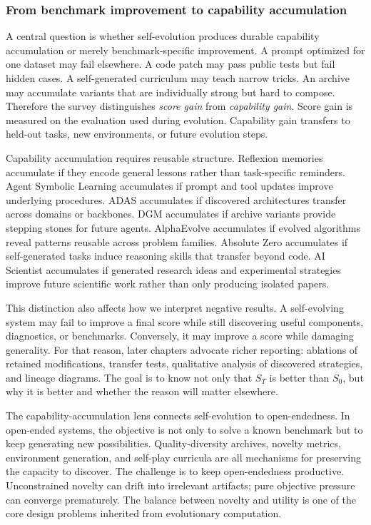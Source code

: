 \subsubsection{From benchmark improvement to capability accumulation}

A central question is whether self-evolution produces durable capability accumulation or merely benchmark-specific improvement. A prompt optimized for one dataset may fail elsewhere. A code patch may pass public tests but fail hidden cases. A self-generated curriculum may teach narrow tricks. An archive may accumulate variants that are individually strong but hard to compose. Therefore the survey distinguishes \emph{score gain} from \emph{capability gain}. Score gain is measured on the evaluation used during evolution. Capability gain transfers to held-out tasks, new environments, or future evolution steps.

Capability accumulation requires reusable structure. Reflexion memories accumulate if they encode general lessons rather than task-specific reminders. Agent Symbolic Learning accumulates if prompt and tool updates improve underlying procedures. ADAS accumulates if discovered architectures transfer across domains or backbones. DGM accumulates if archive variants provide stepping stones for future agents. AlphaEvolve accumulates if evolved algorithms reveal patterns reusable across problem families. Absolute Zero accumulates if self-generated tasks induce reasoning skills that transfer beyond code. AI Scientist accumulates if generated research ideas and experimental strategies improve future scientific work rather than only producing isolated papers.

This distinction also affects how we interpret negative results. A self-evolving system may fail to improve a final score while still discovering useful components, diagnostics, or benchmarks. Conversely, it may improve a score while damaging generality. For that reason, later chapters advocate richer reporting: ablations of retained modifications, transfer tests, qualitative analysis of discovered strategies, and lineage diagrams. The goal is to know not only that $S_T$ is better than $S_0$, but why it is better and whether the reason will matter elsewhere.

The capability-accumulation lens connects self-evolution to open-endedness. In open-ended systems, the objective is not only to solve a known benchmark but to keep generating new possibilities. Quality-diversity archives, novelty metrics, environment generation, and self-play curricula are all mechanisms for preserving the capacity to discover. The challenge is to keep open-endedness productive. Unconstrained novelty can drift into irrelevant artifacts; pure objective pressure can converge prematurely. The balance between novelty and utility is one of the core design problems inherited from evolutionary computation.

